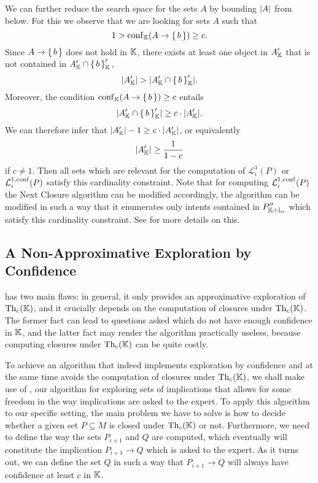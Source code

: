 We can further reduce the search space for the sets $A$ by bounding $\lvert A\rvert$ from below.
For this we observe that we are looking for sets $A$ such that
\begin{equation*}
  1 > \operatorname{conf}_{{\mathbb{K}}}(A \to {\ensuremath{\{\,b\,\}}}) \ge c.
\end{equation*}
Since $A \to {\ensuremath{\{\,b\,\}}}$ does not hold in ${\mathbb{K}}$, there exists at least one object in
$A_{{\mathbb{K}}}'$ that is not contained in $A_{{\mathbb{K}}}' \cap {\ensuremath{\{\,b\,\}}}_{{\mathbb{K}}}'$, \ie
\begin{equation*}
  \lvert A_{{\mathbb{K}}}' \rvert > \lvert A_{{\mathbb{K}}}' \cap {\ensuremath{\{\, b \,\}}}_{{\mathbb{K}}}' \rvert.
\end{equation*}
Moreover, the condition $\operatorname{conf}_{{\mathbb{K}}}(A \to {\ensuremath{\{\,b\,\}}}) \ge c$ entails
\begin{equation*}
  \lvert A_{{\mathbb{K}}}' \cap {\ensuremath{\{\,b\,\}}}_{{\mathbb{K}}}' \rvert \ge c \cdot \lvert A_{{\mathbb{K}}}'\rvert.
\end{equation*}
We can therefore infer that $\lvert A_{{\mathbb{K}}}'\rvert - 1 \geq c \cdot \lvert A_{{\mathbb{K}}}'\rvert$, or
equivalently
\begin{equation*}
  \lvert A_{{\mathbb{K}}}'\rvert \geq \frac{1}{1 - c}
\end{equation*}
if $c \neq 1$.  Then all sets which are relevant for the computation of
$\mathcal{L}_{i}^{1}(P)$ or $\mathcal{L}_{i}^{1,\operatorname{conf}}(P)$ satisfy this cardinality
constraint.  Note that for computing $\mathcal{L}_{i}^{1,\operatorname{conf}}(P)$ the Next Closure
algorithm can be modified accordingly, \ie the algorithm can be modified in such a way
that it enumerates only intents contained in $P_{{\mathbb{K}} \div {\ensuremath{\mathbb{L}}}_{i}}''$ which satisfy
this cardinality constraint.  See \cite[Theorem~51]{fca-book} for more details on this.

\subsection{A Non-Approximative Exploration by Confidence}
\label{sec:poss-fast-expl}

 has two main flaws: in general, it only
provides an approximative exploration of $\operatorname{Th}_{c}({\mathbb{K}})$, and it crucially depends on
the computation of closures under $\operatorname{Th}_{c}({\mathbb{K}})$.  The former fact can lead to
questions asked which do not have enough confidence in ${\mathbb{K}}$, and the latter fact may
render the algorithm practically useless, because computing closures under $\operatorname{Th}_{c}({\mathbb{K}})$ can be quite costly.

To achieve an algorithm that indeed implements exploration by confidence and at the same
time avoids the computation of closures under $\operatorname{Th}_{c}({\mathbb{K}})$, we shall make use of
, our algorithm for exploring sets of
implications that allows for some freedom in the way implications are asked to the expert.
To apply this algorithm to our specific setting, the main problem we have to solve is how
to decide whether a given set $P \subseteq M$ is closed under $\operatorname{Th}_{c}({\mathbb{K}})$ or not.
Furthermore, we need to define the way the sets $P_{i+1}$ and $Q$ are computed, which
eventually will constitute the implication $P_{i+1} \to Q$ which is asked to the expert.
As it turns out, we can define the set $Q$ in such a way that $P_{i+1} \to Q$ will always
have confidence at least $c$ in ${\mathbb{K}}$.

